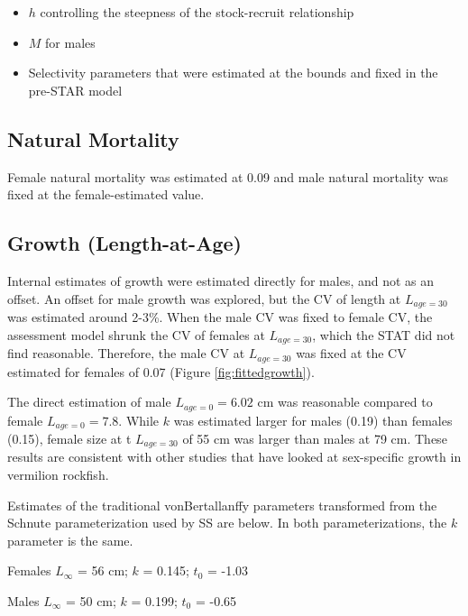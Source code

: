 \documentclass[
  english,
  a4paper,
]{article}
\providecommand{\tightlist}{%
  \setlength{\itemsep}{0pt}\setlength{\parskip}{0pt}}
\begin{document}
\begin{itemize}
\tightlist
\item
  \(h\) controlling the steepness of the stock-recruit relationship
\item
  \(M\) for males
\item
  Selectivity parameters that were estimated at the bounds and fixed in the pre-STAR model
\end{itemize}

\hypertarget{natural-mortality-1}{%
\subsection{Natural Mortality}\label{natural-mortality-1}}

Female natural mortality was estimated at 0.09 and male natural mortality was fixed at the female-estimated value.

\hypertarget{growth-length-at-age}{%
\subsection{Growth (Length-at-Age)}\label{growth-length-at-age}}

Internal estimates of growth were estimated directly for males, and not as an offset. An offset for male growth was explored, but the CV of length at \(L_{age=30}\) was estimated around 2-3\%. When the male CV was fixed to female CV, the assessment model shrunk the CV of females at \(L_{age=30}\), which the STAT did not find reasonable. Therefore, the male CV at \(L_{age=30}\) was fixed at the CV estimated for females of 0.07 (Figure \ref{fig:fittedgrowth}).

The direct estimation of male \(L_{age=0}=6.02\) cm was reasonable compared to female \(L_{age=0}=7.8\). While \(k\) was estimated larger for males (0.19) than females (0.15), female size at t \(L_{age=30}\) of 55 cm was larger than males at 79 cm. These results are consistent with other studies that have looked at sex-specific growth in vermilion rockfish.

Estimates of the traditional vonBertallanffy parameters transformed from the Schnute parameterization used by SS are below. In both parameterizations, the \(k\) parameter is the same.

\begin{centering}

Females $L_{\infty}$ = 56 cm; $k$ = 0.145; $t_0$ = -1.03

Males $L_{\infty}$ = 50 cm; $k$ = 0.199; $t_0$ = -0.65

\end{centering}
\end{document}
